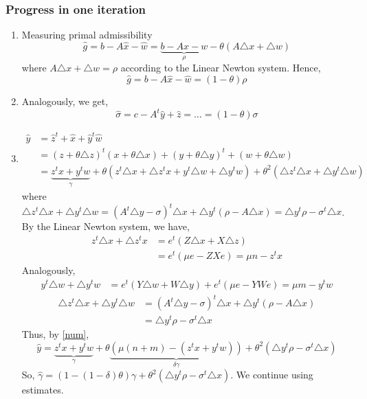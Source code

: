 \documentclass[a4paper]{article}
\numberwithin{lecref}{subsection}
\begin{document}
\subsubsection{Progress in one iteration}
\begin{enumerate}
	\item Measuring primal admissibility
		\[ \hat g = b - A \hat x - \hat w = \underbrace{b - Ax - w}_{\rho} - \theta (A\triangle x + \triangle w) \]
		where $A\triangle x + \triangle w = \rho$ according to the Linear Newton system. Hence,
		\[ \hat g = b - A \hat x - \hat w = (1 - \theta) \rho \]
	\item Analogously, we get,
		\[ \hat \sigma = c - A^t \hat y + \hat z = \dots = (1 - \theta) \sigma \]
	\item
		\begin{align}
			\hat y &= \hat z^t + \hat x + \hat y^t \hat w \label{num}\\
				&= (z + \theta \triangle z)^t (x + \theta \triangle x) + (y + \theta \triangle y)^t + (w + \theta \triangle w) \nonumber\\
				&= \underbrace{z^t x + y^t w}_{\gamma} + \theta (z^t \triangle x + \triangle z^t x + y^t \triangle w + \triangle y^t w)
				+ \theta^2 (\triangle z^t \triangle x + \triangle y^t \triangle w) \nonumber
		\end{align}
		where $\triangle z^t \triangle x + \triangle y^t \triangle w = (A^t \triangle y - \sigma)^t \triangle x + \triangle y^t (\rho - A \triangle x) = \triangle y^t \rho - \sigma^t \triangle x$.
		By the Linear Newton system, we have,
		\begin{align*}
			z^t \triangle x + \triangle z^t x &= e^t \left(Z \triangle x + X \triangle z\right) \\
				&= e^t \left(\mu e - ZXe\right) = \mu n - z^t x
		\end{align*}
		Analogously,
		\begin{align*}
			y^t \triangle w + \triangle y^t w &= e^t \left(Y \triangle w + W \triangle y\right) + e^t \left(\mu e - YWe\right) = \mu m - y^t w
		\end{align*}
		\begin{align*}
			\triangle z^t \triangle x + \triangle y^t \triangle w
				&= (A^t \triangle y - \sigma)^t \triangle x + \triangle y^t (\rho - A \triangle x) \\
				&= \triangle y^t \rho - \sigma^t \triangle x
		\end{align*}
		Thus, by \eqref{num},
		\[ \hat y = \underbrace{z^t x + y^t w}_{\gamma} + \theta\underbrace{\left(\mu(n + m) - (z^t x + y^t w)\right)}_{\delta \gamma} + \theta^2 \left(\triangle y^t \rho - \sigma^t \triangle x\right) \]
		So, $\hat\gamma = (1 - (1 - \delta) \theta) \gamma + \theta^2 \left(\triangle y^t \rho - \sigma^t \triangle x\right)$.
		We continue using estimates.


\end{enumerate}
\end{document}
